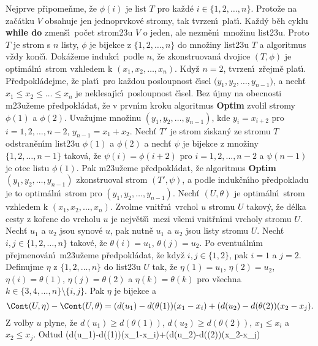 \documentclass[a4paper,12pt]{article}
\begin{document}
\flushpar Nejprve p\v ripome\v nme, \v ze $\phi (i)$ je list $T$ 
pro ka\v zd\'e $i\in \{1,2,\dots,n\}$.  Proto\v ze na za\v c\'atku $
V$ 
obsahuje jen 
jednoprvko\-v\'e stromy, tak tvrzen\'\i\ plat\'\i .  Ka\v zd\'y b\v eh cyklu 
{\bf while do} zmen\v s\'\i\ po\v cet strom\accent23u $V$ o jeden, ale nezm\v en\'\i\ 
mno\v zinu list\accent23u.  Proto $T$ je strom s $n$ listy, $\phi$ je 
bijekce z $\{1,2,\dots,n\}$ do mno\v ziny list\accent23u $T$ a algoritmus 
v\v zdy kon\v c\'\i .  Dok\'a\v zeme indukc\'\i\ podle $n$, \v ze zkonstruovan\'a 
dvojice $(T,\phi )$ je optim\'aln\'\i\ strom vzhledem k $(x_1,x_2
,\dots,x_n)$.  
Kdy\v z $n=2$, tvrzen\'\i\ z\v rejm\v e plat\'\i .  P\v redpokl\'adejme, \v ze 
plat\'\i\ pro ka\v zdou posloupnost \v c\'\i sel $(y_1,y_2,\dots,$$
y_{n-1})$, a 
nech\v t $x_1\le x_2\le\dots\le x_n$ je neklesaj\'\i c\'\i\ posloupnost \v c\'\i sel.  Bez \'ujmy na 
obecnosti m\accent23u\v zeme p\v redpokl\'adat, \v ze v prvn\'\i m kroku 
algoritmus {\bf Optim} zvolil stromy $\phi (1)$ a $\phi (2)$.  Uva\v zujme mno\v zinu 
$(y_1,y_2,\dots,y_{n-1})$, kde $y_i=x_{i+2}$ pro $i=1,2,\dots,n-2$, 
$y_{n-1}=x_1+x_2$.  Nech\v t $T'$ je strom z\'\i skan\'y ze stromu $
T$  
odstran\v en\'\i m list\accent23u $\phi (1)$ a $\phi (2)$ a nech\v t $
\psi$ je bijekce z 
mno\v ziny $\{1,2,\dots,n-1\}$ takov\'a, \v ze $\psi (i)=\phi (i+
2)$ pro 
$i=1,2,\dots,n-2$ a $\psi (n-1)$ je otec listu $\phi (1)$.  Pak 
m\accent23u\v zeme p\v redpokl\'adat, \v ze algoritmus 
{\bf Optim$(y_1,y_2,\dots,y_{n-1})$} zkonstruoval strom $(T',\psi 
)$, a podle induk\v cn\'\i ho 
p\v redpokladu je to optim\'aln\'\i\ strom pro $(y_1,y_2,\dots,y_{
n-1})$.  Nech\v t 
$(U,\theta )$ je optim\'aln\'\i\ strom vzhledem k $(x_1,x_2,\dots
,x_n)$.  Zvolme 
vnit\v rn\'\i\ vrchol $u$ stromu $U$ takov\'y, \v ze d\'elka cesty z ko\v rene 
do vrcholu $u$ je nej\-v\v et\v s\'\i\ mezi v\v semi vnit\v rn\'\i mi vrcholy 
stromu $U$.  Nech\v t $u_1$ a $u_2$ jsou synov\'e $u$, pak nutn\v e $
u_1$ 
a $u_2$ jsou listy stromu $U$.  Nech\v t $i,j\in \{1,2,\dots,n\}$ takov\'e, \v ze 
$\theta (i)=u_1$, $\theta (j)=u_2$.  Po eventu\'aln\'\i m p\v rejmenov\'an\'\i\ m\accent23u\v zeme 
p\v redpokl\'adat, \v ze kdy\v z $i,j\in \{1,2\}$, pak $i=1$ a 
$j=2$.  Definujme $\eta$ z $\{1,2,\dots,n\}$ do list\accent23u $U$ tak, \v ze 
$\eta (1)=u_1$, $\eta (2)=u_2$, $\eta (i)=\theta (1)$, $\eta (j)=
\theta (2)$ a $\eta (k)=\theta (k)$ pro 
v\v sechna $k\in \{3,4,\dots,n\}\setminus \{i,j\}$.  Pak $\eta$ je bijekce a 
$$\Cont(U,\eta )-\Cont(U,\theta )=(d(u_1)-d(\theta (1))(x_1-x_i)+
(d(u_2)-d(\theta (2))(x_2-x_j).$$
Z volby $u$ plyne, \v ze $d(u_1)\ge d(\theta (1))$, $d(u_2)\ge d(
\theta (2))$, 
$x_1\le x_i$ a $x_2\le x_j$. Odtud  
$$(d(u_1)-d(\theta (1))(x_1-x_i)+(d(u_2)-d(\theta (2))(x_2-x_j)\le 
\end{document}
